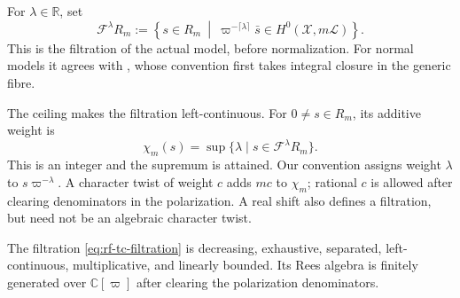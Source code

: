 \begin{definition}\label{def:rf-tc-filtration}
For $\lambda\in\mathbb R$, set
\[
 \mathcal F^\lambda R_m
 :=\left\{s\in R_m\ \middle|\
       \varpi^{-\lceil\lambda\rceil}\bar s
       \in H^0(\mathcal X,m\mathcal L)\right\}.
\tag{65.2}\label{eq:rf-tc-filtration}
\]
This is the filtration of the actual model, before normalization. For normal models it agrees with , whose convention first takes integral closure in the generic fibre.
\end{definition}

The ceiling makes the filtration left-continuous. For $0\ne s\in R_m$, its additive weight is
\[
               \chi_m(s)=\sup\{\lambda\mid s\in\mathcal F^\lambda R_m\}.
\tag{65.3}\label{eq:rf-additive-weight}
\]
This is an integer and the supremum is attained. Our convention assigns weight $\lambda$ to $s\varpi^{-\lambda}$. A character twist of weight $c$ adds $mc$ to $\chi_m$; rational $c$ is allowed after clearing denominators in the polarization. A real shift also defines a filtration, but need not be an algebraic character twist.

\noindent\begin{minipage}{\linewidth}
\begin{proposition}\label{prop:rf-filtration-properties}
The filtration \eqref{eq:rf-tc-filtration} is decreasing, exhaustive, separated, left-continuous, multiplicative, and linearly bounded. Its Rees algebra is finitely generated over $\mathbb C[\varpi]$ after clearing the polarization denominators.
\end{proposition}
\end{minipage}\par

